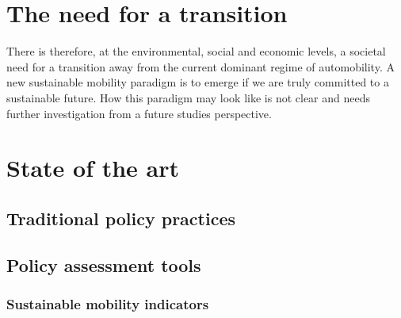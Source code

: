\section{The need for a transition}
\label{s:intro:need-for-transition}


There is therefore, at the environmental, social and economic levels, a societal need for a transition away from the current dominant regime of automobility. A new sustainable mobility paradigm is to emerge if we are truly committed to a sustainable future. How this paradigm may look like is not clear and needs further investigation from a future studies perspective.

\section{State of the art}
\label{s:intro:state-of-art}


\subsection{Traditional policy practices}
\label{ss:intro:traditional-policy-practices}


\subsection{Policy assessment tools}
\label{ss:intro:policy-assessment-tools}

\subsubsection{Sustainable mobility indicators}
\label{sss:intro:sustainable-mobility-indicators}

